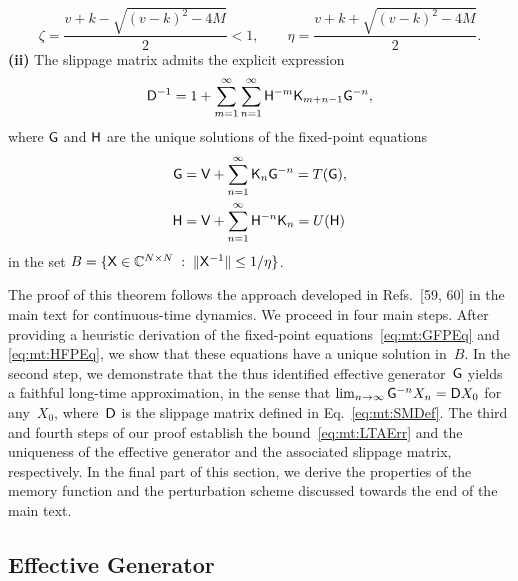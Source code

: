 \documentclass[aps,prl,reprint]{revtex4-2}
\begin{document}
{\begin{equation}
	\zeta = \frac{v+k-\sqrt{(v-k)^2-4M}}{2}<1, \qquad
	\eta  = \frac{v+k+\sqrt{(v-k)^2-4M}}{2}.
	\end{equation}
	\textbf{(ii)} The slippage matrix admits the explicit expression
	\begin{equation}\label{eq:mt:SMDef}
	\mathsf{D}^{-1} = 1+ \sum_{m=1}^\infty\sum_{n=1}^\infty \mathsf{H}^{-m}\mathsf{K}_{m+n-1}\mathsf{G}^{-n},
	\end{equation}
	where $\mathsf{G}$ and $\mathsf{H}$ are the unique solutions of the fixed-point equations
	\begin{align}
	\label{eq:mt:GFPEq}
	\mathsf{G} &= \mathsf{V} + \sum_{n=1}^\infty \mathsf{K}_n\mathsf{G}^{-n} = T(\mathsf{G}), \\
	\label{eq:mt:HFPEq}
	\mathsf{H} &= \mathsf{V} + \sum_{n=1}^\infty \mathsf{H}^{-n}\mathsf{K}_n = U(\mathsf{H})
	\end{align}
	in the set $B= \{\mathsf{X}\in\mathbb{C}^{N\times N} \; : \; \lVert \mathsf{X}^{-1} \rVert\leq 1/\eta\}$.\\
}

The proof of this theorem follows the approach developed in Refs.~[59, 60] in the main text  for continuous-time dynamics.
We proceed in four main steps.
After providing a heuristic derivation of the fixed-point equations~\eqref{eq:mt:GFPEq} and \eqref{eq:mt:HFPEq}, we show that these equations have a unique solution in~$B$.
In the second step, we demonstrate that the thus identified effective generator~$\mathsf{G}$ yields a faithful long-time approximation, in the sense that $\lim_{n\rightarrow\infty}\mathsf{G}^{-n}X_n = \mathsf{D} X_0$ for any~$X_0$, where~$\mathsf{D}$ is the slippage matrix defined in Eq.~\eqref{eq:mt:SMDef}.
The third and fourth steps of our proof establish the bound~\eqref{eq:mt:LTAErr} and the uniqueness of the effective generator and the associated slippage matrix, respectively.
In the final part of this section, we derive the properties of the memory function and the perturbation scheme discussed towards the end of the main text.

\subsection{Effective Generator}\label{sec:effective_propagator}
\end{document}

